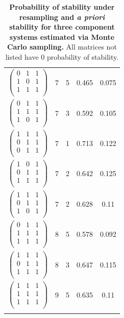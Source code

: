 \documentclass{amsart}
\theoremstyle{definition}
\theoremstyle{remark}
\numberwithin{equation}{section}
\begin{document}
\begin{longtable}{ c || c | c | c | c }
$\begin{pmatrix}
0 & 1 & 1\\
1 & 0 & 1\\
1 & 1 & 1\\
\end{pmatrix}$ & 7 & 5 & 0.465 & 0.075\\
$\begin{pmatrix}
0 & 1 & 1\\
1 & 1 & 1\\
1 & 0 & 1\\
\end{pmatrix}$ & 7 & 3 & 0.592 & 0.105\\
$\begin{pmatrix}
1 & 1 & 1\\
0 & 1 & 1\\
0 & 1 & 1\\
\end{pmatrix}$ & 7 & 1 & 0.713 & 0.122\\
$\begin{pmatrix}
1 & 0 & 1\\
0 & 1 & 1\\
1 & 1 & 1\\
\end{pmatrix}$ & 7 & 2 & 0.642 & 0.125\\
$\begin{pmatrix}
1 & 1 & 1\\
0 & 1 & 1\\
1 & 0 & 1\\
\end{pmatrix}$ & 7 & 2 & 0.628 & 0.11\\
$\begin{pmatrix}
0 & 1 & 1\\
1 & 1 & 1\\
1 & 1 & 1\\
\end{pmatrix}$ & 8 & 5 & 0.578 & 0.092\\
$\begin{pmatrix}
1 & 1 & 1\\
0 & 1 & 1\\
1 & 1 & 1\\
\end{pmatrix}$ & 8 & 3 & 0.647 & 0.115\\
$\begin{pmatrix}
1 & 1 & 1\\
1 & 1 & 1\\
1 & 1 & 1\\
\end{pmatrix}$ & 9 & 5 & 0.635 & 0.11\\
\caption{{\bf Probability of stability under resampling and \emph{a priori} stability for three component systems estimated via Monte Carlo sampling.} All matrices not listed have $0$ probability of stability.}\label{tab:structstabmat3}
\end{longtable}
%
\end{document}
